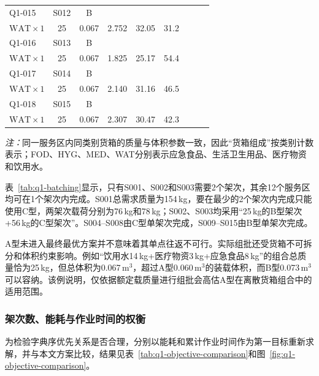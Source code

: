 \documentclass[bwprint,fontset=fandol]{gmcmthesis}
\begin{document}
\begin{longtable}{@{}lcclrrrrr@{}}
    Q1-015 & S012 & B & \shortstack[l]{\strut $\mathrm{FOD}\times1$\quad $\mathrm{MED}\times1$\\\strut $\mathrm{WAT}\times1$} & 25 & 0.067 & 2.752 & 32.05 & 31.2 \\[3pt]
    Q1-016 & S013 & B & \shortstack[l]{\strut $\mathrm{FOD}\times1$\quad $\mathrm{MED}\times1$\\\strut $\mathrm{WAT}\times1$} & 25 & 0.067 & 1.825 & 25.17 & 54.4 \\[3pt]
    Q1-017 & S014 & B & \shortstack[l]{\strut $\mathrm{FOD}\times1$\quad $\mathrm{MED}\times1$\\\strut $\mathrm{WAT}\times1$} & 25 & 0.067 & 2.140 & 31.16 & 46.5 \\[3pt]
    Q1-018 & S015 & B & \shortstack[l]{\strut $\mathrm{FOD}\times1$\quad $\mathrm{MED}\times1$\\\strut $\mathrm{WAT}\times1$} & 25 & 0.067 & 2.307 & 30.47 & 42.3 \\[3pt]
\end{longtable}
\endgroup

\noindent\textit{注：}同一服务区内同类别货箱的质量与体积参数一致，因此“货箱组成”按类别计数表示；FOD、HYG、MED、WAT分别表示应急食品、生活卫生用品、医疗物资和饮用水。

表~\ref{tab:q1-batching}显示，只有S001、S002和S003需要2个架次，其余12个服务区均可在1个架次内完成。S001总需求质量为154\,kg，要在最少的2个架次内完成只能使用C型，两架次载荷分别为76\,kg和78\,kg；S002、S003均采用“25\,kg的B型架次+56\,kg的C型架次”。S004--S008由C型单架次完成，S009--S015由B型单架次完成。

A型未进入最终最优方案并不意味着其单点往返不可行。实际组批还受货箱不可拆分和体积约束影响。例如“饮用水14\,kg+医疗物资3\,kg+应急食品8\,kg”的组合总质量恰为25\,kg，但总体积为0.067\,m$^3$，超过A型0.060\,m$^3$的装载体积，而B型0.073\,m$^3$可以容纳。该例说明，仅依据额定载质量进行组批会高估A型在离散货箱组合中的适用范围。

\subsubsection{架次数、能耗与作业时间的权衡}
为检验字典序优先关系是否合理，分别以能耗和累计作业时间作为第一目标重新求解，并与本文方案比较，结果见表~\ref{tab:q1-objective-comparison}和图~\ref{fig:q1-objective-comparison}。
\end{document}
